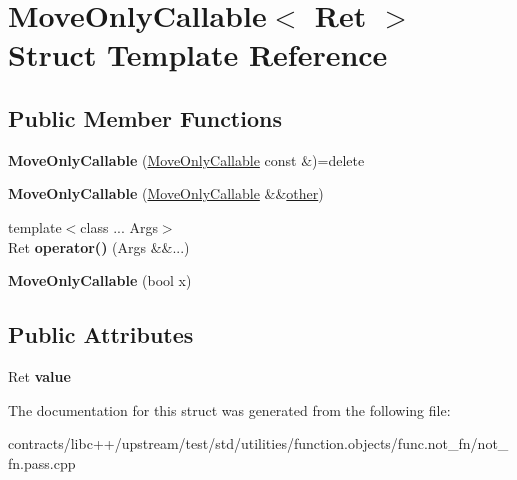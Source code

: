 \hypertarget{struct_move_only_callable}{}\section{Move\+Only\+Callable$<$ Ret $>$ Struct Template Reference}
\label{struct_move_only_callable}
\subsection*{Public Member Functions}
\begin{DoxyCompactItemize}
\item 
\mbox{\label{struct_move_only_callable_aafdd75164ebcc953c988fd9b3d11aa42}} 
{\bfseries Move\+Only\+Callable} (\mbox{\hyperlink{struct_move_only_callable}{Move\+Only\+Callable}} const \&)=delete
\item 
\mbox{\label{struct_move_only_callable_a5d3b4d4b34fc2fb6bf5bcaf03f1a18df}} 
{\bfseries Move\+Only\+Callable} (\mbox{\hyperlink{struct_move_only_callable}{Move\+Only\+Callable}} \&\&\mbox{\hyperlink{structother}{other}})
\item 
\mbox{\label{struct_move_only_callable_a80e8cf95b882dbd43a8bea6bf45507c4}} 
{\footnotesize template$<$class ... Args$>$ }\\Ret {\bfseries operator()} (Args \&\&...)
\item 
\mbox{\label{struct_move_only_callable_ace98176484774c0408c8a2a8c3c21c83}} 
{\bfseries Move\+Only\+Callable} (bool x)
\end{DoxyCompactItemize}
\subsection*{Public Attributes}
\begin{DoxyCompactItemize}
\item 
\mbox{\label{struct_move_only_callable_a8cfacbf55762c12ff7ec982bc7a12fd2}} 
Ret {\bfseries value}
\end{DoxyCompactItemize}


The documentation for this struct was generated from the following file\+:\begin{DoxyCompactItemize}
\item 
contracts/libc++/upstream/test/std/utilities/function.\+objects/func.\+not\+\_\+fn/not\+\_\+fn.\+pass.\+cpp\end{DoxyCompactItemize}
